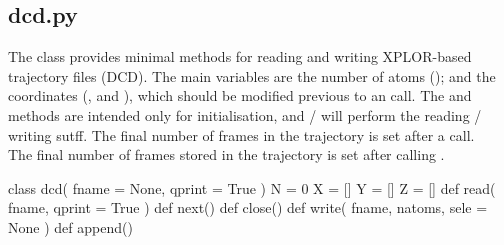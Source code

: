 \normalsize
\subsection[dcd]{dcd.py}
The class  provides
minimal methods for reading and writing XPLOR-based trajectory files (DCD). The main variables are
the number of atoms (); and the coordinates (,  and ), which should
be modified previous to an  call. The  and  methods are intended
only for initialisation, and  /  will perform the reading / writing sutff.
The final number of frames in the trajectory is set after a  call.\\
The final number of frames stored in the trajectory is set after calling .
\begin{pyglist}[language=python,fvset={frame=single}]
class dcd( fname = None, qprint = True )
    N = 0
    X = []
    Y = []
    Z = []
    def read( fname, qprint = True )
    def next()
    def close()
    def write( fname, natoms, sele = None )
    def append()
\end{pyglist}
